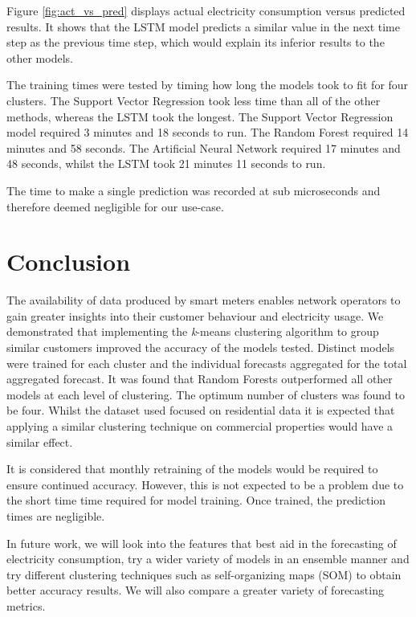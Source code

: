 Figure \ref{fig:act_vs_pred} displays actual electricity consumption versus predicted results. It shows that the LSTM model predicts a similar value in the next time step as the previous time step, which would explain its inferior results to the other models.  

The training times were tested by timing how long the models took to fit for four clusters. The Support Vector Regression took less time than all of the other methods, whereas the LSTM took the longest. The Support Vector Regression model required 3 minutes and 18 seconds to run. The Random Forest required 14 minutes and 58 seconds. The Artificial Neural Network required 17 minutes and 48 seconds, whilst the LSTM took 21 minutes 11 seconds to run.

The time to make a single prediction was recorded at sub microseconds and therefore deemed negligible for our use-case.

\section{Conclusion}

The availability of data produced by smart meters enables network operators to gain greater insights into their customer behaviour and electricity usage. We demonstrated that implementing the \textit{k}-means clustering algorithm to group similar customers improved the accuracy of the models tested. Distinct models were trained for each cluster and the individual forecasts aggregated for the total aggregated forecast. It was found that Random Forests outperformed all other models at each level of clustering. The optimum number of clusters was found to be four. Whilst the dataset used focused on residential data it is expected that applying a similar clustering technique on commercial properties would have a similar effect.

It is considered that monthly retraining of the models would be required to ensure continued accuracy. However, this is not expected to be a problem due to the short time time required for model training. Once trained, the prediction times are negligible.

In future work, we will look into the features that best aid in the forecasting of electricity consumption, try a wider variety of models in an ensemble manner and try different clustering techniques such as self-organizing maps (SOM) to obtain better accuracy results. We will also compare a greater variety of forecasting metrics.





